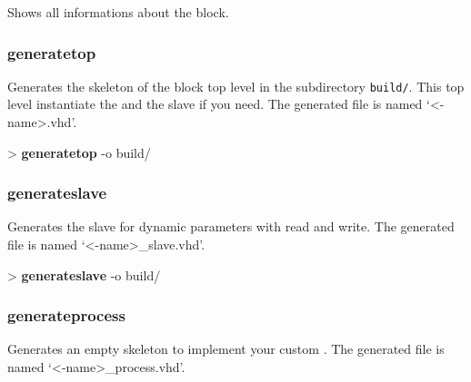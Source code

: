 \documentclass[10pt,a4paper]{article}
\begin{document}
Shows all informations about the block.

\subsubsection{generatetop}

Generates the skeleton of the block top level in the subdirectory \texttt{build/}. This top level instantiate the \kind{} and the slave if you need. The generated file is named `<\kind{}-name>.vhd'.\\


\begin{sampletitle}
> \textbf{\tool{} generatetop} -o build/
\end{sampletitle}

\subsubsection{generateslave}

Generates the slave for dynamic parameters with read and write. The generated file is named `<\kind{}-name>\_slave.vhd'.\\


\begin{sampletitle}
> \textbf{\tool{} generateslave} -o build/
\end{sampletitle}

\subsubsection{generateprocess}

Generates an empty skeleton to implement your custom \kind{}. The generated file is named `<\kind{}-name>\_process.vhd'.\\
\end{document}

